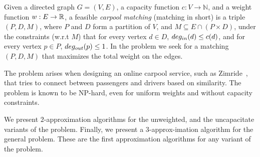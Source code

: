 \abstract{}
Given a directed graph $G = (V, E)$,
a capacity function $ c: V \rightarrow \mathbb{N} $,
and a weight function $w : E \rightarrow \mathbb{R} $,
a feasible \emph{carpool matching} (matching in short) is a triple 
$(P, D, M)$, where $P$ and $D$ form a partition of $V$, and 
$M \subseteq E \cap (P \times D)$,
under the constraints (w.r.t $M$) that for every vertex $d \in D$, 
$deg_{in}(d) \leq c(d)$, 
and for every vertex $p \in P$, $deg_{out}(p) \leq 1$.
In the \textsc{\CARPOOL{}} problem we seek for a matching $(P, D, M)$ that maximizes the
total weight on the edges.

The problem arises when designing an online carpool service, 
such as Zimride~\cite{zimride}, 
that tries to connect between passengers and drivers based on similarity.
The problem is known to be NP-hard, 
even for uniform weights and without capacity constraints.

We present $2$-approximation algorithms for the 
unweighted, and the uncapacitate variants of the problem.
Finally, we present a $3$-approx-imation algorithm for the general problem.
These are the first approximation algorithms for any variant of the problem.
